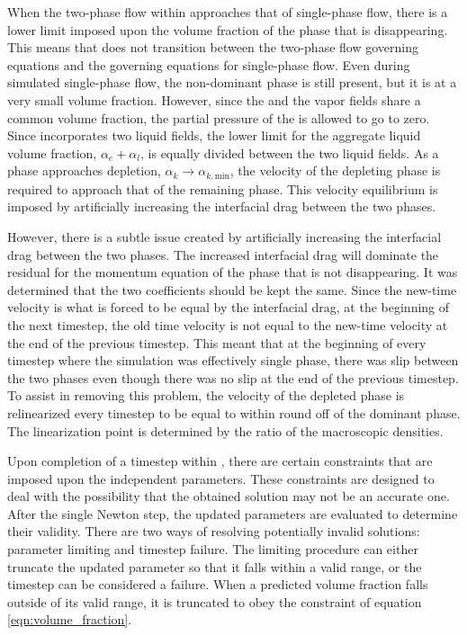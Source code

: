 When the two-phase flow within \cobra{} approaches that of single-phase flow, there is a lower limit imposed upon the volume fraction of the phase that is disappearing.
This means that \cobra{} does not transition between the two-phase flow governing equations and the governing equations for single-phase flow.
Even during simulated single-phase flow, the non-dominant phase is still present, but it is at a very small volume fraction.
However, since the \ncgs{} and the vapor fields share a common volume fraction, the partial pressure of the \ncgs{} is allowed to go to zero. 
Since \cobra{} incorporates two liquid fields, the lower limit for the aggregate liquid volume fraction, $\alpha_e + \alpha_l$, is equally divided between the two liquid fields.
As a phase approaches depletion, $\alpha_k \rightarrow \alpha_{k,\text{min}}$, the velocity of the depleting phase is required to approach that of the remaining phase.
This velocity equilibrium is imposed by artificially increasing the interfacial drag between the two phases.

However, there is a subtle issue created by artificially increasing the interfacial drag between the two phases.
The increased interfacial drag will dominate the residual for the momentum equation of the phase that is not disappearing.
It was determined that the two coefficients should be kept the same.
Since the new-time velocity is what is forced to be equal by the interfacial drag, at the beginning of the next timestep, the old time velocity is not equal to the new-time velocity at the end of the previous timestep.
This meant that at the beginning of every timestep where the simulation was effectively single phase, there was slip between the two phases even though there was no slip at the end of the previous timestep.
To assist in removing this problem, the velocity of the depleted phase is relinearized every timestep to be equal to within round off of the dominant phase.
The linearization point is determined by the ratio of the macroscopic densities.
 
Upon completion of a timestep within \cobra{}, there are certain constraints that are imposed upon the independent parameters.
These constraints are designed to deal with the possibility that the obtained solution may not be an accurate one.
After the single Newton step, the updated parameters are evaluated to determine their validity.
There are two ways of resolving potentially invalid solutions: parameter limiting and timestep failure.
The limiting procedure can either truncate the updated parameter so that it falls within a valid range, or the timestep can be considered a failure.
When a predicted volume fraction falls outside of its valid range, it is truncated to obey the constraint of equation \eqref{eqn:volume_fraction}.

